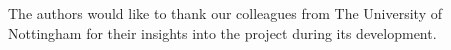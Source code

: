  The authors would like to thank our colleagues from The University of Nottingham for their insights into the project during its development.

